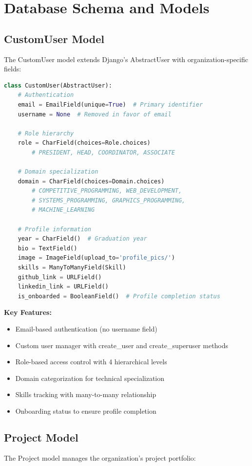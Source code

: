 \documentclass[11pt,a4paper]{article}
\begin{document}
\section{Database Schema and Models}

\subsection{CustomUser Model}
The CustomUser model extends Django's AbstractUser with organization-specific fields:

\begin{lstlisting}[language=Python]
class CustomUser(AbstractUser):
    # Authentication
    email = EmailField(unique=True)  # Primary identifier
    username = None  # Removed in favor of email
    
    # Role hierarchy
    role = CharField(choices=Role.choices)
        # PRESIDENT, HEAD, COORDINATOR, ASSOCIATE
    
    # Domain specialization
    domain = CharField(choices=Domain.choices)
        # COMPETITIVE_PROGRAMMING, WEB_DEVELOPMENT,
        # SYSTEMS_PROGRAMMING, GRAPHICS_PROGRAMMING,
        # MACHINE_LEARNING
    
    # Profile information
    year = CharField()  # Graduation year
    bio = TextField()
    image = ImageField(upload_to='profile_pics/')
    skills = ManyToManyField(Skill)
    github_link = URLField()
    linkedin_link = URLField()
    is_onboarded = BooleanField()  # Profile completion status
\end{lstlisting}

\textbf{Key Features:}
\begin{itemize}[leftmargin=*]
    \item Email-based authentication (no username field)
    \item Custom user manager with create\_user and create\_superuser methods
    \item Role-based access control with 4 hierarchical levels
    \item Domain categorization for technical specialization
    \item Skills tracking with many-to-many relationship
    \item Onboarding status to ensure profile completion
\end{itemize}

\subsection{Project Model}
The Project model manages the organization's project portfolio:
\end{document}
